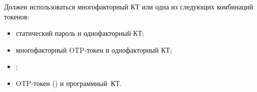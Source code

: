 Должен использоваться многофакторный  КТ или одна из 
следующих комбинаций токенов:
\begin{itemize}
\item
статический пароль и однофакторный  КТ;
\item
многофакторный OTP-токен и однофакторный  КТ;
\item
{};
\item
{} OTP-токен ()
и программный~КТ.
\end{itemize}


